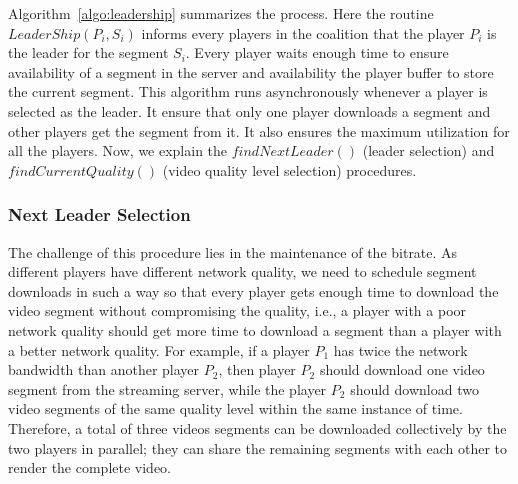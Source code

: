 Algorithm~\ref{algo:leadership} summarizes the process. 
Here the routine $LeaderShip(P_i, S_i)$ informs every players in the coalition that the player $P_i$ is the leader for the segment $S_i$. 
Every player waits enough time to ensure availability of a segment in the server and availability the player buffer to store the current segment. This algorithm runs asynchronously whenever a player is selected as the leader. It ensure that only one player downloads a segment and other players get the segment from it. It also ensures the maximum utilization for all the players. Now, we explain the $findNextLeader()$ (leader selection) and $findCurrentQuality()$ (video quality level selection) procedures.


\subsubsection{Next Leader Selection} The challenge of this procedure lies in the maintenance of the bitrate. As different players have different network quality, we need to schedule segment downloads in such a way so that every player gets enough time to download the video segment without compromising the quality, i.e.,  a player with a poor network quality should get more time to download a segment than a player with a better network quality. For example, if a player $P_1$ has twice the network bandwidth than another player $P_2$, then player $P_2$ should download one video segment from the streaming server, while the player $P_2$ should download two video segments of the same quality level within the same instance of time. Therefore, a total of three videos segments can be downloaded collectively by the two players in parallel; they can share the remaining segments with each other to render the complete video. 

